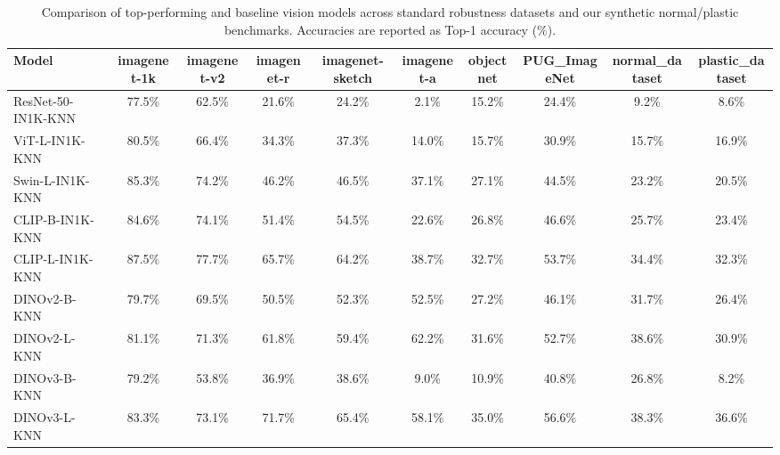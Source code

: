 \begin{table}[h]
\centering
\scriptsize
\begin{tabular}{lccccccccc}
\toprule
\textbf{Model} & \textbf{imagenet-1k} & \textbf{imagenet-v2} & \textbf{imagenet-r} & \textbf{imagenet-sketch} & \textbf{imagenet-a} & \textbf{objectnet} & \textbf{PUG\_ImageNet} & \textbf{normal\_dataset} & \textbf{plastic\_dataset} \\
\midrule
ResNet-50-IN1K-KNN & 77.5\% & 62.5\% & 21.6\% & 24.2\% & 2.1\% & 15.2\% & 24.4\% & 9.2\% & 8.6\% \\
ViT-L-IN1K-KNN & 80.5\% & 66.4\% & 34.3\% & 37.3\% & 14.0\% & 15.7\% & 30.9\% & 15.7\% & 16.9\% \\
Swin-L-IN1K-KNN & 85.3\% & 74.2\% & 46.2\% & 46.5\% & 37.1\% & 27.1\% & 44.5\% & 23.2\% & 20.5\% \\
CLIP-B-IN1K-KNN & 84.6\% & 74.1\% & 51.4\% & 54.5\% & 22.6\% & 26.8\% & 46.6\% & 25.7\% & 23.4\% \\
CLIP-L-IN1K-KNN & 87.5\% & 77.7\% & 65.7\% & 64.2\% & 38.7\% & 32.7\% & 53.7\% & 34.4\% & 32.3\% \\
DINOv2-B-KNN & 79.7\% & 69.5\% & 50.5\% & 52.3\% & 52.5\% & 27.2\% & 46.1\% & 31.7\% & 26.4\% \\
DINOv2-L-KNN & 81.1\% & 71.3\% & 61.8\% & 59.4\% & 62.2\% & 31.6\% & 52.7\% & 38.6\% & 30.9\% \\
DINOv3-B-KNN & 79.2\% & 53.8\% & 36.9\% & 38.6\% & 9.0\% & 10.9\% & 40.8\% & 26.8\% & 8.2\% \\
DINOv3-L-KNN & 83.3\% & 73.1\% & 71.7\% & 65.4\% & 58.1\% & 35.0\% & 56.6\% & 38.3\% & 36.6\% \\
\bottomrule
\end{tabular}
\caption{Comparison of top-performing and baseline vision models across standard robustness datasets and our synthetic normal/plastic benchmarks. Accuracies are reported as Top-1 accuracy (\%).}
\label{tab:model_robustness_comparison}
\end{table}

